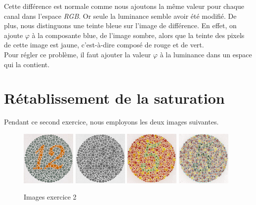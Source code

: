 \documentclass[a4paper,11pt]{article}
\begin{document}
Cette différence est normale comme nous ajoutons la même valeur pour 
chaque canal dans l'espace \textit{RGB}. Or seule la luminance semble
avoir été modifié. De plus, nous distinguons une teinte bleue sur 
l'image de différence. En effet, on ajoute $\varphi$ à la composante 
blue, de l'image sombre, alors que la teinte des pixels de cette image 
est jaune, c'est-à-dire composé de rouge et de vert.\\

Pour régler ce problème, il faut ajouter la valeur $\varphi$ à la 
luminance dans un espace qui la contient. 

\newpage

\section{Rétablissement de la saturation}

Pendant ce second exercice, nous employons les deux images suivantes.

\begin{figure}[H]
  \begin{center}  
    \includegraphics[width=100px]{images/it2_72pp.png}
    \includegraphics[width=100px]{images/it2_72pp_gris.png}
    \includegraphics[width=100px]{images/it3_72pp.png}
    \includegraphics[width=100px]{images/it3_72pp_saturation_faible.png}
    \caption{Images exercice 2}
  \end{center}
\end{figure}
\end{document}
